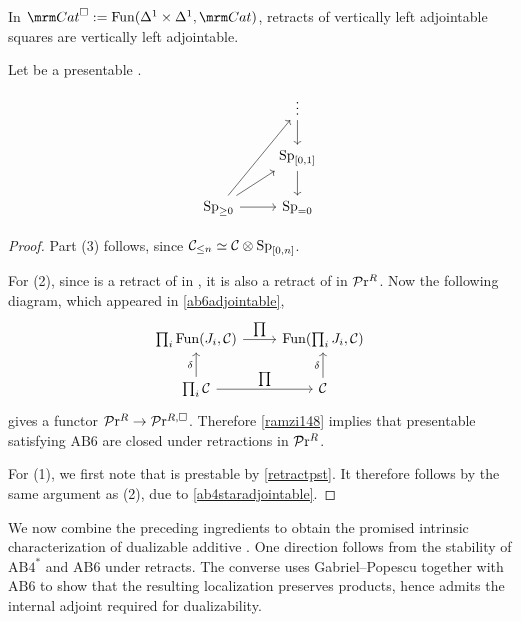 \documentclass[a4paper,10pt, oneside]{amsart}
\begin{document}
	\begin{lem}\label{ramzi148}
		In $\Cat^\square:=\funct(\Delta^1\times\Delta^1,\Cat)$, retracts of vertically left adjointable squares are vertically left adjointable.
	\end{lem}
	\begin{prop}\label{retractab6}
		Let \mcc be a presentable \infcat.
		$$\begin{tikzcd}
			& \vdots \arrow[d] \\
			& \opsp_{[0,1]} \arrow[d] \\
			\spgeq \arrow[r] \arrow[ru] \arrow[ruu] & \opsp_{=0}
		\end{tikzcd}$$
	\end{prop}
	\begin{proof}
		Part (3) follows, since $\mathcal{C}_{\leq n} \simeq \mathcal{C} \otimes \mathrm{Sp}_{[0,n]}$. 
		
		For (2), since \mcc is a retract of \mcd in \prl, it is also a retract of \mcd in $\mathcal{P}\mathrm{r}^R$. Now the following diagram, which appeared in \cref{ab6adjointable},
		$$\begin{tikzcd}
			{\prod_i \funct(J_i,\mcc)} \arrow[r, "\prod"]    & {\funct(\prod_i J_i,\mcc)} \\
			\prod_i \mcc \arrow[u, "\delta"] \arrow[r, "\prod"] & \mcc \arrow[u, "\delta"]     
		\end{tikzcd} $$ 
		gives a functor $\mathcal{P}\mathrm{r}^R\to\mathcal{P}\mathrm{r}^{R,\square} $. Therefore  \cref{ramzi148} implies that presentable \infcats satisfying $\mathrm{AB6}$ are closed under retractions in $\mathcal{P}\mathrm{r}^R$.
		
		For (1), we first note that \mcc is prestable by \cref{retractpst}. It therefore follows by the same argument as (2), due to \cref{ab4staradjointable}.
	\end{proof}
	We now combine the preceding ingredients to obtain the promised intrinsic characterization of dualizable additive \infcats. One direction follows from the stability of $\mathrm{AB4}^*$ and $\mathrm{AB6}$ under retracts. The converse uses Gabriel--Popescu together with $\mathrm{AB6}$ to show that the resulting localization preserves products, hence admits the internal adjoint required for dualizability.
	
\end{document}
